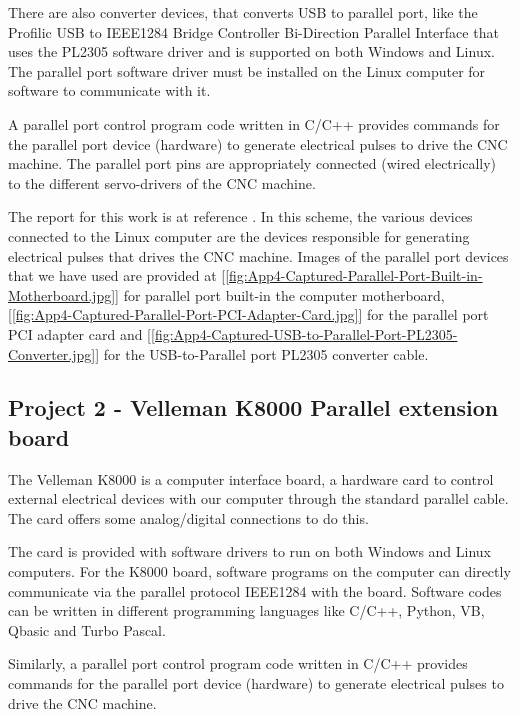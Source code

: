 There are also converter devices, that converts USB to parallel port, like the Profilic USB to IEEE1284 Bridge Controller Bi-Direction Parallel Interface that uses the PL2305 software driver and is supported on both Windows and Linux. The parallel port software driver must be installed on the Linux computer for software to communicate with it. 
\vspace*{1\baselineskip}

A parallel port control program code written in C/C++ provides commands for the parallel port device (hardware) to generate electrical pulses to drive the CNC machine. The parallel port pins are appropriately connected (wired electrically) to the different servo-drivers of the CNC machine.
\vspace*{1\baselineskip}

The report for this work is at reference \cite{FYP_Abzal_2012}. In this scheme, the various devices connected to the Linux computer are the devices responsible for generating electrical pulses that drives the CNC machine. Images of the parallel port devices that we have used are provided at [\ref{fig:App4-Captured-Parallel-Port-Built-in-Motherboard.jpg}] for parallel port built-in the computer motherboard,  [\ref{fig:App4-Captured-Parallel-Port-PCI-Adapter-Card.jpg}] for the parallel port PCI adapter card and [\ref{fig:App4-Captured-USB-to-Parallel-Port-PL2305-Converter.jpg}] for the USB-to-Parallel port PL2305 converter cable.


\subsection{Project 2 - Velleman K8000 Parallel extension board}

The Velleman K8000 is a computer interface board, a hardware card to control external electrical devices with our computer through the standard parallel cable. The card offers some analog/digital connections to do this.
\vspace*{1\baselineskip}
	
The card is provided with software drivers to run on both Windows and Linux computers. For the K8000 board, software programs on the computer can directly communicate via the parallel protocol IEEE1284 with the board. Software codes can be written in different programming languages like C/C++, Python, VB, Qbasic and Turbo Pascal. 
\vspace*{1\baselineskip}
	
Similarly, a parallel port control program code written in C/C++ provides commands for the parallel port device (hardware) to generate electrical pulses to drive the CNC machine. 
\vspace*{1\baselineskip}
	
